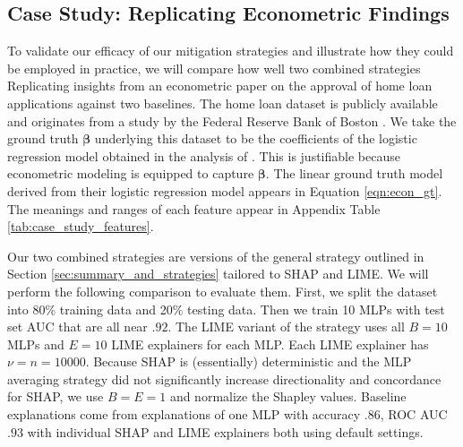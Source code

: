 \documentclass[mnsc,blindrev]{informs3}
\begin{document}
\subsection{Case Study: Replicating Econometric Findings}
    \label{sec:case_study}
    To validate our efficacy of our mitigation strategies and illustrate how they could be employed in practice, we will compare how well two combined strategies Replicating insights from an econometric paper on the approval of home loan applications \citep{bane2006econometric} against two baselines. The home loan dataset is publicly available and originates from a study by the Federal Reserve Bank of Boston \citep{hunter1996cultural}. We take the ground truth $\boldsymbol{\beta}$ underlying this dataset to be the coefficients of the logistic regression model obtained in the analysis of \cite{bane2006econometric}. This is justifiable because econometric modeling is equipped to capture $\boldsymbol{\beta}$. The linear ground truth model derived from their logistic regression model appears in Equation \ref{eqn:econ_gt}. The meanings and ranges of each feature appear in Appendix Table \ref{tab:case_study_features}.  %

    Our two combined strategies are versions of the general strategy outlined in Section \ref{sec:summary_and_strategies} tailored to SHAP and LIME. We will perform the following comparison to evaluate them. First, we split the dataset into 80\% training data and 20\% testing data. Then we train 10 MLPs with test set AUC that are all near $.92$. The LIME variant of the strategy uses all $B=10$ MLPs and $E=10$ LIME explainers for each MLP. Each LIME explainer has $\nu=n=10000$. Because SHAP is (essentially) deterministic and the MLP averaging strategy did not significantly increase directionality and concordance for SHAP, we use $B=E=1$ and normalize the Shapley values. Baseline explanations come from explanations of one MLP with accuracy $.86$, ROC AUC $.93$ with individual SHAP and LIME explainers both using default settings. 
    
\end{document}
